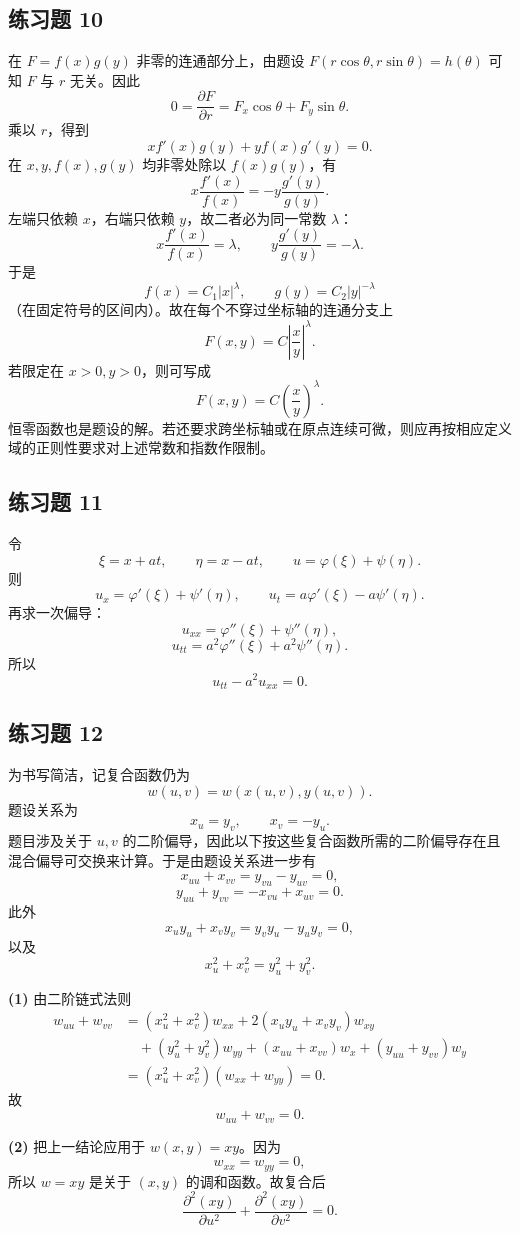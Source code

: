 \subsection*{练习题 10}
\begin{xsolution}
在 $F=f(x)g(y)$ 非零的连通部分上，由题设 $F(r\cos\theta,r\sin\theta)=h(\theta)$ 可知 $F$ 与 $r$ 无关。因此
\[
  0=\frac{\partial F}{\partial r}
  =F_x\cos\theta+F_y\sin\theta.
\]
乘以 $r$，得到
\[
  xf'(x)g(y)+yf(x)g'(y)=0.
\]
在 $x,y,f(x),g(y)$ 均非零处除以 $f(x)g(y)$，有
\[
  x\frac{f'(x)}{f(x)}
  =-y\frac{g'(y)}{g(y)}.
\]
左端只依赖 $x$，右端只依赖 $y$，故二者必为同一常数 $\lambda$：
\[
  x\frac{f'(x)}{f(x)}=\lambda,
  \qquad
  y\frac{g'(y)}{g(y)}=-\lambda.
\]
于是
\[
  f(x)=C_1|x|^\lambda,
  \qquad
  g(y)=C_2|y|^{-\lambda}
\]
（在固定符号的区间内）。故在每个不穿过坐标轴的连通分支上
\[
  \boxed{F(x,y)=C\left|\frac{x}{y}\right|^\lambda}.
\]
若限定在 $x>0,y>0$，则可写成
\[
  \boxed{F(x,y)=C\left(\frac{x}{y}\right)^\lambda}.
\]
恒零函数也是题设的解。若还要求跨坐标轴或在原点连续可微，则应再按相应定义域的正则性要求对上述常数和指数作限制。
\end{xsolution}

\subsection*{练习题 11}
\begin{xsolution}
令
\[
  \xi=x+at,
  \qquad
  \eta=x-at,
  \qquad
  u=\varphi(\xi)+\psi(\eta).
\]
则
\[
  u_x=\varphi'(\xi)+\psi'(\eta),
  \qquad
  u_t=a\varphi'(\xi)-a\psi'(\eta).
\]
再求一次偏导：
\[
  u_{xx}=\varphi''(\xi)+\psi''(\eta),
\]
\[
  u_{tt}=a^2\varphi''(\xi)+a^2\psi''(\eta).
\]
所以
\[
  \boxed{u_{tt}-a^2u_{xx}=0}.
\]
\end{xsolution}

\subsection*{练习题 12}
\begin{xsolution}
为书写简洁，记复合函数仍为
\[
  w(u,v)=w(x(u,v),y(u,v)).
\]
题设关系为
\[
  x_u=y_v,
  \qquad
  x_v=-y_u.
\]
题目涉及关于 $u,v$ 的二阶偏导，因此以下按这些复合函数所需的二阶偏导存在且混合偏导可交换来计算。于是由题设关系进一步有
\[
  x_{uu}+x_{vv}=y_{vu}-y_{uv}=0,
\]
\[
  y_{uu}+y_{vv}=-x_{vu}+x_{uv}=0.
\]
此外
\[
  x_u y_u+x_v y_v
  =y_vy_u-y_uy_v=0,
\]
以及
\[
  x_u^2+x_v^2=y_u^2+y_v^2.
\]

\textbf{(1)} 由二阶链式法则
\begin{align*}
  w_{uu}+w_{vv}
  &=(x_u^2+x_v^2)w_{xx}
    +2(x_uy_u+x_vy_v)w_{xy}\\
  &\quad +(y_u^2+y_v^2)w_{yy}
    +(x_{uu}+x_{vv})w_x
    +(y_{uu}+y_{vv})w_y\\
  &=(x_u^2+x_v^2)(w_{xx}+w_{yy})=0.
\end{align*}
故
\[
  \boxed{w_{uu}+w_{vv}=0}.
\]

\textbf{(2)} 把上一结论应用于 $w(x,y)=xy$。因为
\[
  w_{xx}=w_{yy}=0,
\]
所以 $w=xy$ 是关于 $(x,y)$ 的调和函数。故复合后
\[
  \boxed{
  \frac{\partial^2(xy)}{\partial u^2}
  +\frac{\partial^2(xy)}{\partial v^2}=0}.
\]
\end{xsolution}

